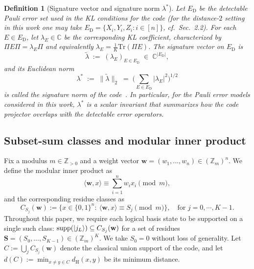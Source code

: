 \documentclass[pdflatex,sn-nature]{sn-jnl}%
\theoremstyle{thmstyleone}%
\theoremstyle{thmstyletwo}%
\theoremstyle{thmstylethree}%
\newtheorem{definition}{Definition}%
\begin{document}
\begin{appendices}
\begin{definition}[Signature vector and signature norm $\lambda^*$]\label{def:signature-norm}
Let $E_{\mathrm D}$ be the detectable Pauli error set used in the KL conditions for the code (for the distance-$2$ setting in this work one may take $E_{\mathrm D}=\{X_i,Y_i,Z_i : i\in[n]\}$, cf.\ Sec.~2.2).
For each $E\in E_{\mathrm D}$, let $\lambda_E \in \mathbb C$ be the corresponding KL coefficient, characterized by
$\Pi E \Pi = \lambda_E \Pi$ and equivalently $\lambda_E = \tfrac{1}{K}\mathrm{Tr}(\Pi E)$.
The signature vector on $E_{\mathrm D}$ is
\[
  \tilde\lambda \;:=\; (\lambda_E)_{E\in E_{\mathrm D}} \;\in\; \mathbb C^{|E_{\mathrm D}|},
\]
and its Euclidean norm
\[
  \lambda^* \;:=\; \|\tilde\lambda\|_2 \;=\;
  \Biggl(\sum_{E\in E_{\mathrm D}} |\lambda_E|^2\Biggr)^{1/2}
\]
is called the signature norm of the code~\cite{Du2024Characterizing,Zhang2025Transversal}. 
In particular, for the Pauli error models considered in this work, $\lambda^*$ is a scalar invariant that summarizes how the code projector overlaps with the detectable error operators.
\end{definition}































\subsection{Subset-sum classes and modular inner product}
\label{subsec:residue-classes}

Fix a modulus $m\in\mathbb{Z}_{>0}$ and a weight vector $\mathbf w=(w_1,\dots,w_n)\in(\mathbb{Z}_m)^n$. We define the modular inner product as
\[
    \langle \mathbf w,x\rangle \equiv \sum_{i=1}^n w_i x_i \pmod m,
\]
and the corresponding residue classes as
\begin{equation}
    C_{S_{j}}(\mathbf w):=\{x\in\{0,1\}^n:\ \langle \mathbf w,x\rangle\equiv S_{j} \pmod m \}, \quad \text{for } j=0, \cdots, K-1.
    \label{eq:res-class-pre}
\end{equation}
Throughout this paper, we require each logical basis state to be supported on a single such class: $\mathrm{supp}(\ket{j_L})\subseteq C_{S_j}(\mathbf w)$ for a set of residues $\mathbf S=(S_0,\dots,S_{K-1})\in(\mathbb{Z}_m)^K$. We take $S_0=0$ without loss of generality. Let $C:=\bigcup_{j}C_{S_j}(\mathbf w)$ denote the classical union support of the code, and let $d(C):=\min_{x\neq y\in C} d_{\mathrm{H}}(x,y)$ be its minimum distance.


\end{appendices}
\end{document}
